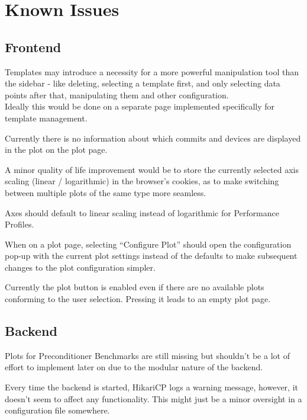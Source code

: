 \section{Known Issues}

\subsection{Frontend}

{Templates may introduce a necessity for a more powerful manipulation tool than the sidebar - like deleting, selecting a template first, and only selecting data points after that, manipulating them and other configuration. \\
Ideally this would be done on a separate page implemented specifically for template management.}

{Currently there is no information about which commits and devices are displayed in the plot on the plot page.}

{A minor quality of life improvement would be to store the currently selected axis scaling (linear / logarithmic) in the browser's cookies, as to make switching between multiple plots of the same type more seamless.}

{Axes should default to linear scaling instead of logarithmic for Performance Profiles.}

{When on a plot page, selecting \enquote{Configure Plot} should open the configuration pop-up with the current plot settings instead of the defaults to make subsequent changes to the plot configuration simpler.}

{Currently the plot button is enabled even if there are no available plots conforming to the user selection. Pressing it leads to an empty plot page.}

\subsection{Backend}

{Plots for Preconditioner Benchmarks are still missing but shouldn't be a lot of effort to implement later on due to the modular nature of the backend.}

{Every time the backend is started, HikariCP logs a warning message, however, it doesn't seem to affect any functionality. This might just be a minor oversight in a configuration file somewhere.}

